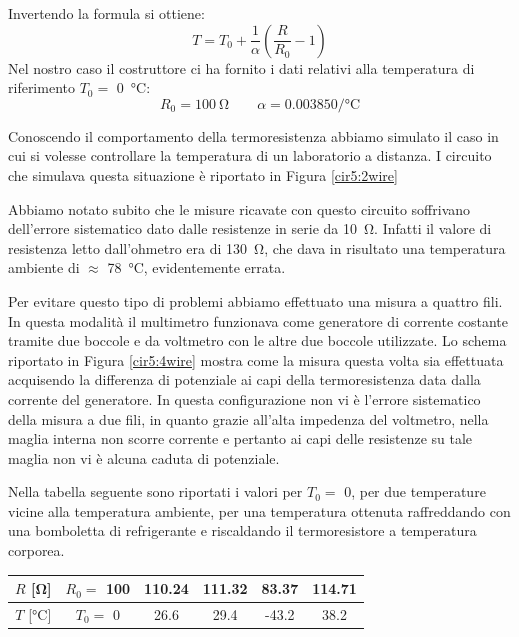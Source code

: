 Invertendo la formula si ottiene:
\begin{equation}
T = T_0 + \frac{1}{\alpha}\left( \frac{R}{R_0}-1 \right)
\end{equation}
Nel nostro caso il costruttore ci ha fornito i dati relativi alla temperatura di riferimento $T_0 =$ \SI{0}{\degreeCelsius}:
$$R_0 = \SI{100}{\ohm} \quad \quad \alpha = 0.003850\si{\per\degreeCelsius}$$

Conoscendo il comportamento della termoresistenza abbiamo simulato il caso in cui si volesse controllare la temperatura di un laboratorio a distanza.
I circuito che simulava questa situazione è riportato in Figura \ref{cir5:2wire}

Abbiamo notato subito che le misure ricavate con questo circuito soffrivano dell'errore sistematico dato dalle resistenze in serie da \SI{10}{\ohm}.
Infatti il valore di resistenza letto dall'ohmetro era di \SI{130}{\ohm}, che dava in risultato una temperatura ambiente di $\approx$ \SI{78}{\degreeCelsius}, evidentemente errata.

Per evitare questo tipo di problemi abbiamo effettuato una misura a quattro fili.
In questa modalità il multimetro funzionava come generatore di corrente costante tramite due boccole e da voltmetro con le altre due boccole utilizzate.
Lo schema riportato in Figura \ref{cir5:4wire} mostra come la misura questa volta sia effettuata acquisendo la differenza di potenziale ai capi della termoresistenza data dalla corrente del generatore.
In questa configurazione non vi è l'errore sistematico della misura a due fili, in quanto grazie all'alta impedenza del voltmetro, nella maglia interna non scorre corrente e pertanto ai capi delle resistenze su tale maglia non vi è alcuna caduta di potenziale.

Nella tabella seguente sono riportati i valori per $T_0 =$ 0, per due temperature vicine alla temperatura ambiente, per una temperatura ottenuta raffreddando con una bomboletta di refrigerante e riscaldando il termoresistore a temperatura corporea.

\begin{center}
{\renewcommand{\arraystretch}{1.4}%
\begin{tabular}{c|c c c c c}
$R$ [\si{\ohm}] 		& $R_0 =$ 100 	& 110.24 & 111.32 & 83.37 & 114.71\\ 
\hline 
$T$ [\si{\degreeCelsius}] 	& $T_0 =$ 0 	& 26.6 & 29.4 & -43.2 & 38.2 \\ 
\end{tabular}}
\end{center}

